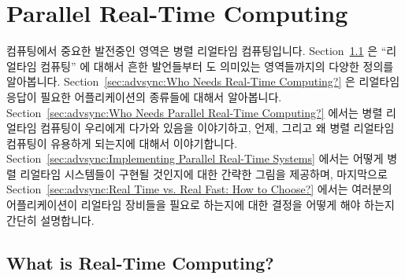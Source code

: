 
\section{Parallel Real-Time Computing}
\label{sec:Parallel Real-Time Computing}
%

컴퓨팅에서 중요한 발전중인 영역은 병렬 리얼타임 컴퓨팅입니다.
Section~\ref{sec:advsync:What is Real-Time Computing?}
은 ``리얼타임 컴퓨팅'' 에 대해서 흔한 발언들부터 도 의미있는 영역들까지의
다양한 정의를 알아봅니다.
Section~\ref{sec:advsync:Who Needs Real-Time Computing?}
은 리얼타임 응답이 필요한 어플리케이션의 종류들에 대해서 알아봅니다.
Section~\ref{sec:advsync:Who Needs Parallel Real-Time Computing?}
에서는 병렬 리얼타임 컴퓨팅이 우리에게 다가와 있음을 이야기하고, 언제, 그리고
왜 병렬 리얼타임 컴퓨팅이 유용하게 되는지에 대해서 이야기합니다.
Section~\ref{sec:advsync:Implementing Parallel Real-Time Systems}
에서는 어떻게 병렬 리얼타임 시스템들이 구현될 것인지에 대한 간략한 그림을
제공하며, 마지막으로
Section~\ref{sec:advsync:Real Time vs. Real Fast: How to Choose?}
에서는 여러분의 어플리케이션이 리얼타임 장비들을 필요로 하는지에 대한 결정을
어떻게 해야 하는지 간단히 설명합니다.

\subsection{What is Real-Time Computing?}
\label{sec:advsync:What is Real-Time Computing?}


